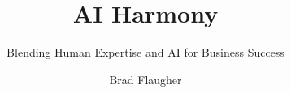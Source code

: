 \documentclass[
    letterpaper, %
    fontsize=10pt, %
    twoside=false, %
	numbers=noenddot, %
]{kaobook}
\begin{document}



%



\titlehead{}
\subject{}

\title[AI Harmony]{AI Harmony}
\subtitle{Blending Human Expertise and AI for Business Success}

\author[Brad Flaugher]{Brad Flaugher}

\date{}

\publishers{\texttt{[image: publogo]}}


\frontmatter %



\end{document}
